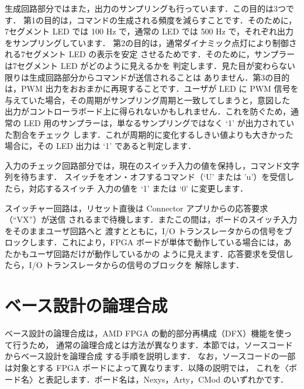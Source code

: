 生成回路部分ではまた，出力のサンプリングも行っています．この目的は3つです．
第1の目的は，コマンドの生成される頻度を減らすことです．そのために，7セグメント
LED では 100 Hz で，通常の LED では 500 Hz で，それぞれ出力をサンプリングしています．
第2の目的は，通常ダイナミック点灯により制御される7セグメント LED の表示を安定
させるためです．そのために，サンプラーは7セグメント LED がどのように見えるかを
判定します．見た目が変わらない限りは生成回路部分からコマンドが送信されることは
ありません．第3の目的は，PWM 出力をおおまかに再現することです．ユーザが LED に
PWM 信号を与えていた場合，その周期がサンプリング周期と一致してしまうと，意図した
出力がコントローラボード上に得られないかもしれません．これを防ぐため，通常の LED
用のサンプラーは，単なるサンプリングではなく `1' が出力されていた割合をチェック
します．これが周期的に変化するしきい値よりも大きかった場合に，その LED 出力は `1'
であると判定します．

入力のチェック回路部分では，現在のスイッチ入力の値を保持し，コマンド文字列を待ちます．
スイッチをオン・オフするコマンド（`U' または 'u'）を受信したら，対応するスイッチ
入力の値を `1' または `0' に変更します．

スイッチャー回路は，リセット直後は Connector アプリからの応答要求（``VX''）が送信
されるまで待機します．またこの間は，ボードのスイッチ入力をそのままユーザ回路へと
渡すとともに，I/O トランスレータからの信号をブロックします．これにより，FPGA
ボードが単体で動作している場合には，あたかもユーザ回路だけが動作しているかの
ように見えます．応答要求を受信したら，I/O トランスレータからの信号のブロックを
解除します．

\section{ベース設計の論理合成}

ベース設計の論理合成は，AMD FPGA の動的部分再構成（DFX）機能を使って行うため，
通常の論理合成とは方法が異なります．本節では，ソースコードからベース設計を論理合成
する手順を説明します．
なお，ソースコードの一部は対象とする FPGA ボードによって異なります．以降の説明では，
これを〈ボード名〉と表記します．ボード名は，Nexys，Arty，CMod のいずれかです．


